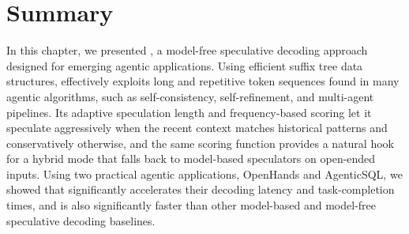 \section{Summary}
\label{suffixdecoding:sec:summary}

In this chapter, we presented \SuffixDecoding, a model-free speculative decoding approach designed for emerging agentic applications. Using efficient suffix tree data structures, \SuffixDecoding effectively exploits long and repetitive token sequences found in many agentic algorithms, such as self-consistency, self-refinement, and multi-agent pipelines. Its adaptive speculation length and frequency-based scoring let it speculate aggressively when the recent context matches historical patterns and conservatively otherwise, and the same scoring function provides a natural hook for a hybrid mode that falls back to model-based speculators on open-ended inputs. Using two practical agentic applications, OpenHands and AgenticSQL, we showed that \SuffixDecoding significantly accelerates their decoding latency and task-completion times, and is also significantly faster than other model-based and model-free speculative decoding baselines.
